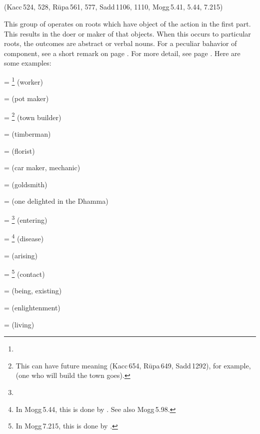 \subparagraph*{} (Kacc\,524, 528, R\=upa\,561, 577, Sadd\,1106, 1110, Mogg\,5.41, 5.44, 7.215)\label{pacck1:dna}\label{pacck1:adna}\label{pacck1:ghadna}\label{pacck1:saka}
 
This group of  operates on roots which have object of the action in the first part. This results in the doer or maker of that objects. When this occurs to particular roots, the outcomes are abstract or verbal nouns. For a peculiar bahavior of  component, see a short remark on page \pageref{pacct1:dna}. For more detail, see page \pageref{par:dnapacc}. Here are some examples:

 = \footnote{} (worker)\par
{} =  (pot maker)\par
{} = \footnote{ This  can have future meaning (Kacc\,654, R\=upa\,649, Sadd\,1292), for example,  (one who will build the town goes).} (town builder)\par
{} =  (timberman)\par
{} =  (florist)\par
{} =  (car maker, mechanic)\par
{} =  (goldsmith)\par
{} =  (one delighted in the Dhamma)\par
{} = \footnote{} (entering)\par
{} = \footnote{In Mogg\,5.44, this is done by . See also Mogg\,5.98.} (disease)\par
{} =  (arising)\par
{} = \footnote{In Mogg\,7.215, this is done by .} (contact)\par
{} =  (being, existing)\par
{} =  (enlightenment)\par
{} =  (living)\par


